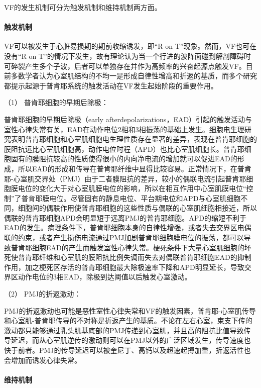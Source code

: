 VF的发生机制可分为触发机制和维持机制两方面。

\paragraph{触发机制}

VF可以被发生于心脏易损期的期前收缩诱发，即“R on
T”现象。然而，VF也可在没有“R on
T”的情况下发生，故有理论认为当一个行进的波阵面碰到解剖障碍时可碎裂产生多个子波，后者可以单独存在并作为高频率的兴奋起源点触发VF。目前多数学者认为心室肌结构的不均一是形成自律性增高和折返的基质，而多个研究都提示起源于普肯耶系统的触发活动在VF发生起始阶段的重要作用。

\hypertarget{text00296.htmlux5cux23CHP10-2-9-1-2-1-1}{}
（1） 普肯耶细胞的早期后除极：

普肯耶细胞的早期后除极（early
afterdepolarizations，EAD）引起的触发活动与室性心律失常有关，EAD在动作电位2相和3相振荡的基础上发生。细胞电生理研究表明普肯耶细胞和心室肌细胞电生理性质存在显著的差异，表现在普肯耶细胞的膜阻抗远比心室肌细胞高，动作电位时程（APD）也比心室肌细胞长。普肯耶细胞固有的膜阻抗较高的性质使得很小的内向净电流的增加就可以促进EAD的形成，所以EAD的形成和传导在普肯耶纤维中显得比较容易。正常情况下，在普肯耶-心室肌交界处（PMJ）由于二者膜阻抗的差异，较小的偶联电流引起普肯耶细胞膜电位的变化大于对心室肌膜电位的影响，所以在相互作用中心室肌膜电位“控制”了普肯耶膜电位。尽管固有的静息电位、平台期电位和APD与心室肌细胞不同，细胞间的偶联作用使普肯耶细胞的这些性质与偶联的心室肌细胞相接近，所以偶联的普肯耶细胞APD会明显短于远离PMJ的普肯耶细胞。APD的缩短不利于EAD的发生。病理条件下，普肯耶细胞本身的自律性增强，或者失去交界区电偶联的约束，或者产生损伤电流通过PMJ加剧普肯耶细胞膜电位的振荡，都可以导致普肯耶细胞EAD的产生而触发室性心律失常。梗死条件下大量心室肌细胞的坏死使普肯耶纤维和心室肌的膜阻抗比例失调而失去对偶联普肯耶细胞EAD的抑制作用，加之梗死区存活的普肯耶细胞最大除极速率下降和APD明显延长，导致交界区动作电位的3相EAD，除极到达阈值以后触发心室激动。

\hypertarget{text00296.htmlux5cux23CHP10-2-9-1-2-1-2}{}
（2） PMJ的折返激动：

PMJ的折返激动也可能是恶性室性心律失常和VF的触发因素，普肯耶-心室肌传导和心室肌-普肯耶传导的不对称是折返产生的基质。不论在左右心室，束支下传的激动都只能够通过乳头肌基底部的PMJ传递到心室肌，并且高的阻抗比值导致传导延迟，而从心室肌逆传的激动则可以在PMJ以外的广泛区域发生，传导速度也快于前者。PMJ的传导延迟可以被奎尼丁、高钙以及超速起搏加重，折返活性也会增加而诱发心律失常。

\paragraph{维持机制}

